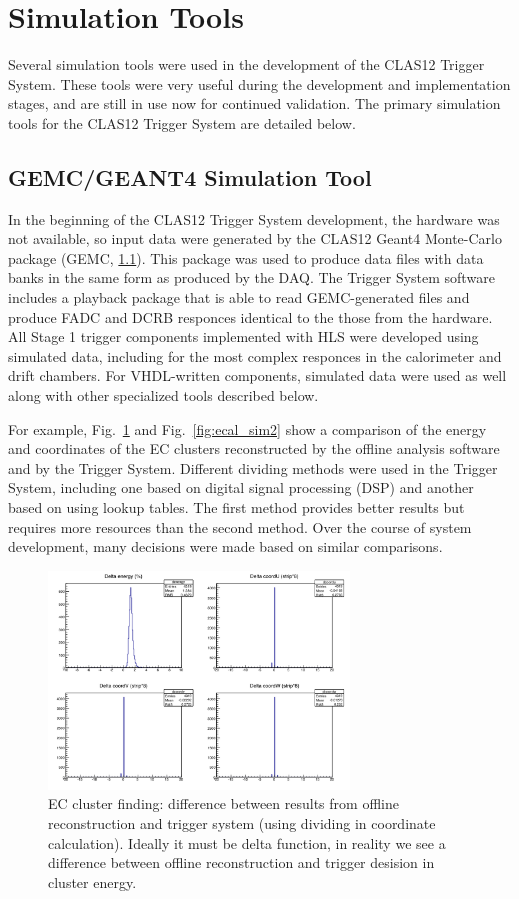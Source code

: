 \section{Simulation Tools}

Several simulation tools were used in the development of the CLAS12 Trigger System. These tools were very useful during the development and implementation stages, and are still in use now for continued validation. The primary simulation tools for the CLAS12 Trigger System are detailed below.


\subsection{GEMC/GEANT4 Simulation Tool}

In the beginning of the CLAS12 Trigger System development, the hardware was not available, so input data were generated by the CLAS12 Geant4 Monte-Carlo package (GEMC, \ref{}). This package was used to produce data files with data banks in the same form as produced by the DAQ. The Trigger System software includes a playback package that is able to read GEMC-generated files and produce FADC and DCRB responces identical to the those from the hardware. All Stage 1 trigger components implemented with HLS were developed using simulated data, including for the most complex responces in the calorimeter and drift chambers. For VHDL-written components, simulated data were used as well along with other specialized tools described below.

For example, Fig.~\ref{fig:ecal_sim1} and Fig.~\ref{fig:ecal_sim2} show a comparison of the energy and coordinates of the EC clusters reconstructed by the offline analysis software and by the Trigger System. Different dividing methods were used in the Trigger System, including one based on digital signal processing (DSP) and another based on using lookup tables. The first method provides better results but requires more resources than the second method. Over the course of system development, many decisions were made based on similar comparisons.

\begin{figure}[htp]
	\begin{center}
		\centering
		\includegraphics[width=8cm]{img/ecal_sim1.png}
		\caption{EC cluster finding: difference between results from offline reconstruction and trigger system (using dividing in coordinate calculation). Ideally it must be delta function, in reality we see a difference between offline reconstruction and trigger desision in cluster energy.}
		\label{fig:ecal_sim1}
	\end{center}
\end{figure} 

